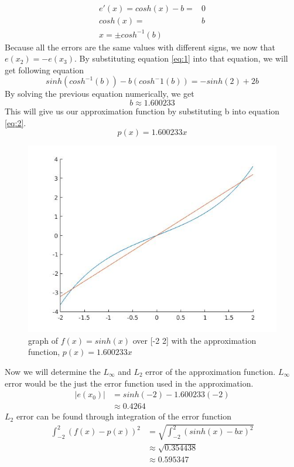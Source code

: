 \documentclass{article}
\begin{document}
\begin{equation} \label{eq:1}
\begin{aligned}
e'(x) = cosh(x) - b =& 0\\
cosh(x) = & b\\
x = \pm cosh^{-1}(b)
\end{aligned}
\end{equation}  
Because all the errors are the same values with different signs, we now that $e(x_2) = - e(x_3)$. By substituting equation \ref{eq:1} into that equation, we will get following equation
\begin{equation*}
sinh(cosh^{-1}(b)) - b(cosh^-1(b)) = - sinh(2) + 2b
\end{equation*}
By solving the previous equation numerically, we get
\begin{equation*}
b \approx 1.600233
\end{equation*}
This will give us our approximation function by substituting b into equation \ref{eq:2}.
\begin{equation*}
p(x) = 1.600233x
\end{equation*}
\begin{figure}[H]
\centering
\includegraphics[width=5in]{figures/q1c.jpg}
\caption{graph of $f(x) = sinh(x)$ over [-2 2] with the approximation function, $p(x) = 1.600233x$}
\end{figure}
Now we will determine the $L_\infty$ and $L_2$ error of the approximation function. $L_\infty$ error would be the just the error function used in the approximation.
\begin{equation*}
\begin{aligned}
|e(x_0)| &= sinh(-2) - 1.600233(-2)\\
	&\approx 0.4264
\end{aligned}
\end{equation*}
$L_2$ error can be found through integration of the error function
\begin{equation*}
\begin{aligned}
\int_{-2}^2(f(x) - p(x))^2 &= \sqrt{\int_{-2}^2(sinh(x) - bx)^2}\\
							&\approx \sqrt{0.354438}\\
							&\approx 0.595347
\end{aligned}
\end{equation*}
\end{document}
